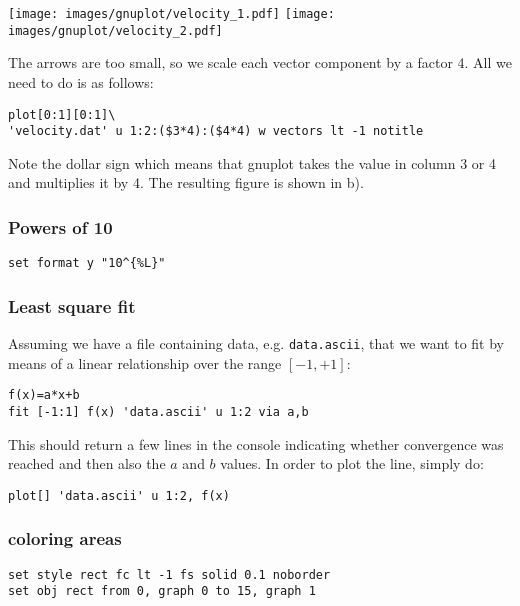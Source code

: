 \begin{center}
\texttt{[image: images/gnuplot/velocity\_1.pdf]}
\texttt{[image: images/gnuplot/velocity\_2.pdf]}
\end{center}

The arrows are too small, so we scale each vector component by a factor 4.
All we need to do is as follows:

\begin{verbatim}
plot[0:1][0:1]\
'velocity.dat' u 1:2:($3*4):($4*4) w vectors lt -1 notitle
\end{verbatim}

Note the dollar sign which 
means that gnuplot takes the value in column 3 or 4 and multiplies it by 4.
The resulting figure is shown in b).

\subsubsection*{Powers of 10}

\begin{verbatim}
set format y "10^{%L}"
\end{verbatim}


\subsubsection*{Least square fit}

Assuming we have a file containing data, e.g. {\tt data.ascii}, that 
we want to fit by means of a linear relationship over the range $[-1,+1]$:
\begin{verbatim}
f(x)=a*x+b 
fit [-1:1] f(x) 'data.ascii' u 1:2 via a,b
\end{verbatim}
This should return a few lines in the console indicating whether 
convergence was reached and then also the $a$ and $b$ values. 
In order to plot the line, simply do:
\begin{verbatim}
plot[] 'data.ascii' u 1:2, f(x)
\end{verbatim}


\subsubsection*{coloring areas}


\begin{verbatim}
set style rect fc lt -1 fs solid 0.1 noborder
set obj rect from 0, graph 0 to 15, graph 1
\end{verbatim}


